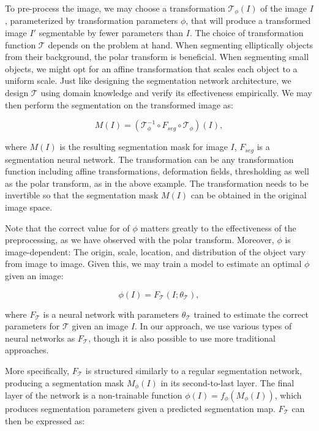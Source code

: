 
To pre-process the image, we may choose a transformation $\mathcal{T}_{\phi}(I)$ of the image $I$, parameterized by transformation parameters $\phi$, that will produce a transformed image $I'$ segmentable by fewer parameters than $I$. The choice of transformation function $\mathcal{T}$ depends on the problem at hand. When segmenting elliptically objects from their background, the polar transform is beneficial. When segmenting small objects, we might opt for an affine transformation that scales each object to a uniform scale. Just like designing the segmentation network architecture, we design $\mathcal{T}$ using domain knowledge and verify its effectiveness empirically. We may then perform the segmentation on the transformed image as:

\begin{equation}
	M(I) = (\mathcal{T}_{\phi}^{-1} \circ F_{seg} \circ \mathcal{T}_{\phi})(I),
\end{equation}

where $M(I)$ is the resulting segmentation mask for image $I$, $F_{seg}$ is a segmentation neural network. The transformation can be any transformation function including affine transformations, deformation fields, thresholding as well as the polar transform, as in the above example. The transformation needs to be invertible so that the segmentation mask $M(I)$ can be obtained in the original image space.

Note that the correct value for of $\phi$ matters greatly to the effectiveness of the preprocessing, as we have observed with the polar transform. Moreover, $\phi$ is image-dependent: The origin, scale, location, and distribution of the object vary from image to image. Given this, we may train a model to estimate an optimal $\phi$ given an image:

\begin{equation}
	\phi(I) = F_{\mathcal{T}}(I; \theta_{\mathcal{T}}),
\end{equation}

where $F_{\mathcal{T}}$ is a neural network with parameters $\theta_{\mathcal{T}}$ trained to estimate the correct parameters for $\mathcal{T}$ given an image $I$. In our approach, we use various types of neural networks as $F_{\mathcal{T}}$, though it is also possible to use more traditional approaches.

More specifically, $F_{\mathcal{T}}$ is structured similarly to a regular segmentation network, producing a segmentation mask $M_\phi(I)$ in its second-to-last layer. The final layer of the network is a non-trainable function $\phi(I) = f_\phi(M_\phi(I))$, which produces segmentation parameters given a predicted segmentation map. $F_{\mathcal{T}}$ can then be expressed as:

